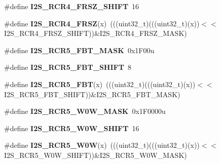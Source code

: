 \begin{DoxyCompactItemize}
\item 
\#define {\bfseries I2\+S\+\_\+\+R\+C\+R4\+\_\+\+F\+R\+S\+Z\+\_\+\+S\+H\+I\+FT}~16\hypertarget{group__I2S__Register__Masks_gaae89e490a3b7562ea1a9a2992a6a97a7}{}\label{group__I2S__Register__Masks_gaae89e490a3b7562ea1a9a2992a6a97a7}

\item 
\#define {\bfseries I2\+S\+\_\+\+R\+C\+R4\+\_\+\+F\+R\+SZ}(x)~(((uint32\+\_\+t)(((uint32\+\_\+t)(x))$<$$<$I2\+S\+\_\+\+R\+C\+R4\+\_\+\+F\+R\+S\+Z\+\_\+\+S\+H\+I\+FT))\&I2\+S\+\_\+\+R\+C\+R4\+\_\+\+F\+R\+S\+Z\+\_\+\+M\+A\+SK)\hypertarget{group__I2S__Register__Masks_ga9fe4075aea194d85306a3f92420895f3}{}\label{group__I2S__Register__Masks_ga9fe4075aea194d85306a3f92420895f3}

\item 
\#define {\bfseries I2\+S\+\_\+\+R\+C\+R5\+\_\+\+F\+B\+T\+\_\+\+M\+A\+SK}~0x1\+F00u\hypertarget{group__I2S__Register__Masks_ga54847f1139b421f0f0df7af775a11996}{}\label{group__I2S__Register__Masks_ga54847f1139b421f0f0df7af775a11996}

\item 
\#define {\bfseries I2\+S\+\_\+\+R\+C\+R5\+\_\+\+F\+B\+T\+\_\+\+S\+H\+I\+FT}~8\hypertarget{group__I2S__Register__Masks_gabe8f4784a8f4ce3235e31483d0b6e5f4}{}\label{group__I2S__Register__Masks_gabe8f4784a8f4ce3235e31483d0b6e5f4}

\item 
\#define {\bfseries I2\+S\+\_\+\+R\+C\+R5\+\_\+\+F\+BT}(x)~(((uint32\+\_\+t)(((uint32\+\_\+t)(x))$<$$<$I2\+S\+\_\+\+R\+C\+R5\+\_\+\+F\+B\+T\+\_\+\+S\+H\+I\+FT))\&I2\+S\+\_\+\+R\+C\+R5\+\_\+\+F\+B\+T\+\_\+\+M\+A\+SK)\hypertarget{group__I2S__Register__Masks_ga833530d170a05c8c6e3812b44bd01bc4}{}\label{group__I2S__Register__Masks_ga833530d170a05c8c6e3812b44bd01bc4}

\item 
\#define {\bfseries I2\+S\+\_\+\+R\+C\+R5\+\_\+\+W0\+W\+\_\+\+M\+A\+SK}~0x1\+F0000u\hypertarget{group__I2S__Register__Masks_ga21ac7b9671ee42b3ff23e61fbc762bd6}{}\label{group__I2S__Register__Masks_ga21ac7b9671ee42b3ff23e61fbc762bd6}

\item 
\#define {\bfseries I2\+S\+\_\+\+R\+C\+R5\+\_\+\+W0\+W\+\_\+\+S\+H\+I\+FT}~16\hypertarget{group__I2S__Register__Masks_ga1b13ac40203b26b4adeb037896cbb88e}{}\label{group__I2S__Register__Masks_ga1b13ac40203b26b4adeb037896cbb88e}

\item 
\#define {\bfseries I2\+S\+\_\+\+R\+C\+R5\+\_\+\+W0W}(x)~(((uint32\+\_\+t)(((uint32\+\_\+t)(x))$<$$<$I2\+S\+\_\+\+R\+C\+R5\+\_\+\+W0\+W\+\_\+\+S\+H\+I\+FT))\&I2\+S\+\_\+\+R\+C\+R5\+\_\+\+W0\+W\+\_\+\+M\+A\+SK)\hypertarget{group__I2S__Register__Masks_gaf0bbc5e0cd36dc9f547c58d21dcd98e5}{}\label{group__I2S__Register__Masks_gaf0bbc5e0cd36dc9f547c58d21dcd98e5}


\end{DoxyCompactItemize}
